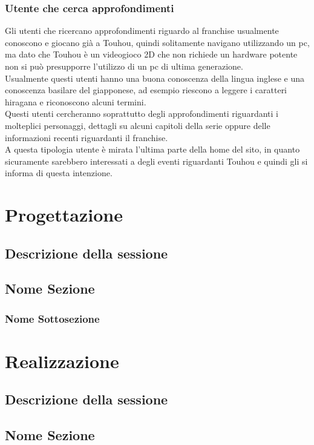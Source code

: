 \documentclass[openany, a4paper, 12pt]{report}
\begin{document}
	\subsection{Utente che cerca approfondimenti}
	Gli utenti che ricercano approfondimenti riguardo al franchise usualmente conoscono e giocano già a Touhou, quindi solitamente navigano utilizzando un pc, ma dato che Touhou è un videogioco 2D che non richiede un hardware potente non si può presupporre l'utilizzo di un pc di ultima generazione.\\
	Usualmente questi utenti hanno una buona conoscenza della lingua inglese e una conoscenza basilare del giapponese, ad esempio riescono a leggere i caratteri hiragana e riconoscono alcuni termini.\\
	Questi utenti cercheranno soprattutto degli approfondimenti riguardanti i molteplici personaggi, dettagli su alcuni capitoli della serie oppure delle informazioni recenti riguardanti il franchise.\\
	A questa tipologia utente è mirata l'ultima parte della home del sito, in quanto sicuramente sarebbero interessati a degli eventi riguardanti Touhou e quindi gli si informa di questa intenzione.
	
	\chapter{Progettazione}
	\section{Descrizione della sessione}
	\section{Nome Sezione}
	\subsection{Nome Sottosezione}
	
	\chapter{Realizzazione}
	\section{Descrizione della sessione}
	\section{Nome Sezione}
\end{document}
